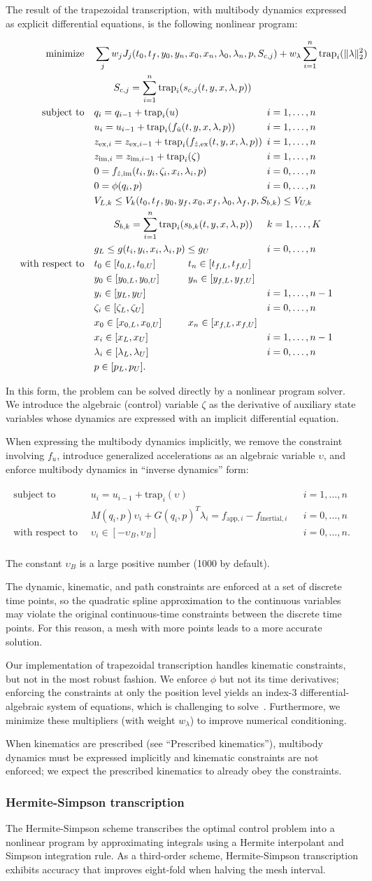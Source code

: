 \documentclass[10pt,letterpaper]{article}
\newcommand{\trapnlp}{
\begin{align}
    \begin{aligned}
        \mbox{minimize} \quad
         & \sum_j w_j J_{j}(t_0, t_f, \mathrlap{y_0, y_n, x_{0}, x_{n}, \lambda_0, \lambda_n, p, S_{c,j})
          + w_{\lambda} \sum_{i=1}^{n} \textrm{trap}_i(\|\lambda\|_2^2)}  \\
         & \quad\quad \mathrlap{S_{c,j} = \sum_{i=1}^{n} \textrm{trap}_i(s_{c,j}(t, y, x, \lambda, p))} \\
        \mbox{subject to} \quad
         & \mathrlap{q_i = q_{i-1} + \textrm{trap}_i(u)} &&&& i = 1, \ldots, n \\
         & \mathrlap{u_i = u_{i-1} + \textrm{trap}_i(f_{\dot{u}}(t, y, x, \lambda, p))}  &&&& i = 1, \ldots, n \\
         & \mathrlap{z_{\textrm{ex},i} = z_{\textrm{ex},i-1} + \textrm{trap}_i(f_{\dot{z},\textrm{ex}}(t, y, x, \lambda, p))} &&&& i = 1, \ldots, n \\
         & \mathrlap{z_{\textrm{im},i} = z_{\textrm{im},i-1} + \textrm{trap}_i(\zeta)} &&&& i = 1, \ldots, n \\
         & \mathrlap{0 = f_{\dot{z},\textrm{im}}(t_i, y_i, \zeta_i, x_i, \lambda_i, p)} &&&& i = 0, \ldots, n \\
         & 0 = \phi(q_i, p)  &&&& i = 0, \ldots, n\\
         & V_{L,k} \leq V_k(t_0, t_f, y_0, \mathrlap{y_f, x_{0}, x_{f}, \lambda_0, \lambda_f, p, S_{b,k}) \leq V_{U,k}} \\
         & \quad\quad \mathrlap{S_{b,k} = \sum_{i=1}^{n} \textrm{trap}_i(s_{b,k}(t, y, x, \lambda, p))} &&&& k = 1, \ldots, K \\
         & \mathrlap{g_{L} \leq g(t_i, y_i, x_{i}, \lambda_i, p) \leq g_{U}}  &&&& i = 0, \ldots, n\\
         \mbox{with respect to} \quad
         & t_0 \in [t_{0,L}, t_{0,U}] && t_n \in [t_{f,L}, t_{f,U}] \\
         & y_0 \in [y_{0,L}, y_{0,U}] && y_n \in [y_{f,L}, y_{f,U}] \\
         & y_i \in [y_{L}, y_{U}] &&&& i = 1, \ldots, n - 1\\
         & \zeta_i \in [\zeta_{L}, \zeta_{U}] &&&& i = 0, \ldots, n \\
         & x_0 \in [x_{0,L}, x_{0,U}] && x_n \in [x_{f,L}, x_{f,U}] \\
         & x_i \in [x_{L}, x_{U}] &&&& i = 1, \ldots, n - 1\\
         & \lambda_i \in [\lambda_L, \lambda_U] &&&& i = 0, \ldots, n \\
         & p \in [p_{L}, p_{U}].
    \end{aligned}
\end{align}
}
\newcommand{\trapimplicit}{
\begin{align}
    \begin{aligned}
    \mbox{subject to} \quad
         & u_i = u_{i-1} + \textrm{trap}_i(\upsilon)  && i = 1, \ldots, n \\
         & M(q_i, p)\upsilon_i + G(q_i, p)^T \lambda_i =
          f_{\textrm{app},i} - f_{\textrm{inertial},i} && i = 0, \ldots, n \\
    \mbox{with respect to} \quad
         & \upsilon_i \in [-\upsilon_{B}, \upsilon_{B}] && i = 0, \ldots, n.\\
    \end{aligned}
\end{align}
}
\begin{document}
The result of the trapezoidal transcription, with multibody dynamics expressed as explicit differential equations, is the following nonlinear program:

\trapnlp

In this form, the problem can be solved directly by a nonlinear program solver. We introduce the algebraic (control) variable $\zeta$ as the derivative of auxiliary state variables whose dynamics are expressed with an implicit differential equation.

When expressing the multibody dynamics implicitly, we remove the constraint involving $f_{\dot{u}}$, introduce generalized accelerations as an algebraic variable $\upsilon$, and enforce multibody dynamics in “inverse dynamics” form:

\trapimplicit

The constant $\upsilon_B$ is a large positive number (1000 by default).

The dynamic, kinematic, and path constraints are enforced at a set of discrete time points, so the quadratic spline approximation to the continuous variables may violate the original continuous-time constraints between the discrete time points. For this reason, a mesh with more points leads to a more accurate solution.

Our implementation of trapezoidal transcription handles kinematic constraints, but not in the most robust fashion. We enforce $\phi$ but not its time derivatives; enforcing the constraints at only the position level yields an index-3 differential-algebraic system of equations, which is challenging to solve~\cite{Hairer:1996,Campbell:2016,Betts:2010}. Furthermore, we minimize these multipliers (with weight $w_\lambda$) to improve numerical conditioning.

When kinematics are prescribed (see “Prescribed kinematics”), multibody dynamics must be expressed implicitly and kinematic constraints are not enforced; we expect the prescribed kinematics to already obey the constraints.

\subsubsection*{Hermite-Simpson transcription}

The Hermite-Simpson scheme transcribes the optimal control problem into a nonlinear program by approximating integrals using a Hermite interpolant and Simpson integration rule. As a third-order scheme, Hermite-Simpson transcription exhibits accuracy that improves eight-fold when halving the mesh interval.
\end{document}
